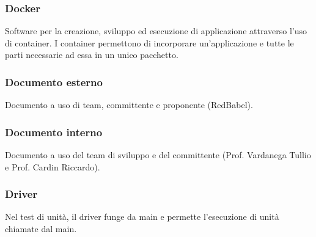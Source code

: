 \subsubsection*{Docker}
Software per la creazione, sviluppo ed esecuzione di applicazione attraverso l’uso di container. I container
permettono di incorporare un’applicazione e tutte le parti necessarie ad essa in un unico pacchetto.

\subsubsection*{Documento esterno}
Documento a uso di team, committente e proponente (RedBabel).

\subsubsection*{Documento interno}
Documento a uso del team di sviluppo e del committente (Prof. Vardanega Tullio e Prof. Cardin Riccardo).

\subsubsection*{Driver }
Nel test di unità, il driver funge da main e permette l'esecuzione di unità chiamate dal main.

